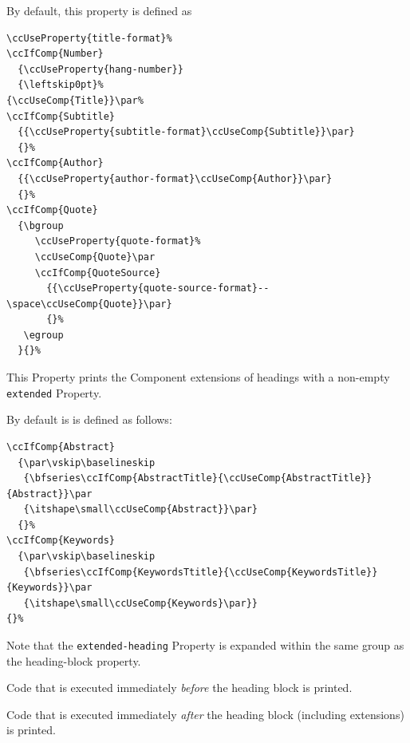 By default, this property is defined as
\begin{lstlisting}[style=tex]
\ccUseProperty{title-format}%
\ccIfComp{Number}
  {\ccUseProperty{hang-number}}
  {\leftskip0pt}%
{\ccUseComp{Title}}\par%
\ccIfComp{Subtitle}
  {{\ccUseProperty{subtitle-format}\ccUseComp{Subtitle}}\par}
  {}%
\ccIfComp{Author}
  {{\ccUseProperty{author-format}\ccUseComp{Author}}\par}
  {}%
\ccIfComp{Quote}
  {\bgroup
     \ccUseProperty{quote-format}%
     \ccUseComp{Quote}\par
     \ccIfComp{QuoteSource}
       {{\ccUseProperty{quote-source-format}--\space\ccUseComp{Quote}}\par}
       {}%
   \egroup
  }{}%
\end{lstlisting}


This Property prints the Component extensions of headings with a
non-empty \lstinline{extended} Property.

By default is is defined as follows:
\begin{lstlisting}[style=tex]
\ccIfComp{Abstract}
  {\par\vskip\baselineskip
   {\bfseries\ccIfComp{AbstractTitle}{\ccUseComp{AbstractTitle}}{Abstract}}\par
   {\itshape\small\ccUseComp{Abstract}}\par}
  {}%
\ccIfComp{Keywords}
  {\par\vskip\baselineskip
   {\bfseries\ccIfComp{KeywordsTtitle}{\ccUseComp{KeywordsTitle}}{Keywords}}\par
   {\itshape\small\ccUseComp{Keywords}\par}}
{}%
\end{lstlisting}

Note that the \lstinline{extended-heading} Property is expanded within
the same group as the heading-block property.


Code that is executed immediately \textit{before} the heading block is
printed.


Code that is executed immediately \textit{after} the heading block
(including extensions) is printed.


